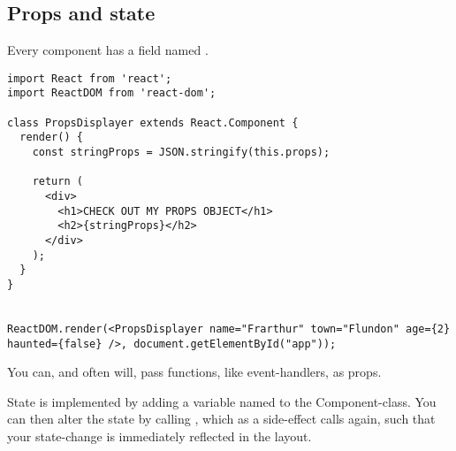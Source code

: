 \subsection{Props and state}
Every component has a field named .
\begin{lstlisting}
import React from 'react';
import ReactDOM from 'react-dom';

class PropsDisplayer extends React.Component {
  render() {
  	const stringProps = JSON.stringify(this.props);

    return (
      <div>
        <h1>CHECK OUT MY PROPS OBJECT</h1>
        <h2>{stringProps}</h2>
      </div>
    );
  }
}


ReactDOM.render(<PropsDisplayer name="Frarthur" town="Flundon" age={2} haunted={false} />, document.getElementById("app"));
\end{lstlisting}

You can, and often will, pass functions, like event-handlers, as props. 


State is implemented by adding a variable named  to the Component-class. You can then alter the state by calling , which as a side-effect calls  again, such that your state-change is immediately reflected in the layout. 

